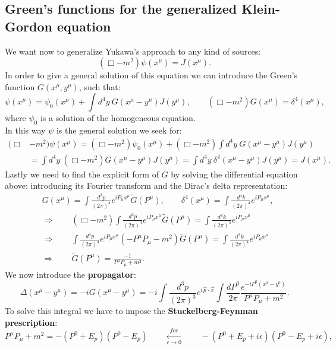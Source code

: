 \subsection{Green's functions for the generalized Klein-Gordon equation}
We want now to generalize Yukawa's approach to any kind of sources:
\begin{equation}
    (\Box-m^2)\psi(x^\mu)=J(x^\mu).
\end{equation}
In order to give a general solution of this equation we can introduce the Green's function $G(x^\mu,y^\mu)$, such that:
\begin{equation*}
    \psi(x^\mu)=\psi_0(x^\mu)+\int d^4y\ G(x^\mu-y^\mu)J(y^\mu),\qquad (\Box-m^2)G(x^\mu)=\delta^4(x^\mu),
\end{equation*}
where $\psi_0$ is a solution of the homogeneous equation.\\
In this way $\psi$ is the general solution we seek for:
\begin{align*}
    (\Box&-m^2)\psi(x^\mu)=(\Box-m^2)\psi_0(x^\mu)+(\Box-m^2)\int d^4y\ G(x^\mu-y^\mu)J(y^\mu)\\&=\int d^4y\ (\Box-m^2)G(x^\mu-y^\mu)J(y^\mu)=\int d^4y\ \delta^4(x^\mu-y^\mu)J(y^\mu)=J(x^\mu).
\end{align*}
Lastly we need to find the explicit form of $G$ by solving the differential equation above: introducing its Fourier transform and the Dirac's delta representation:
\begin{align*}
    &G(x^\mu)=\int\frac{d^3p}{(2\pi)^4}e^{iP_\mu x^\mu} \tilde{G}(P^\mu),\qquad \delta^4(x^\mu)=\int\frac{d^4k}{(2\pi)^4}e^{iP_\mu x^\mu},\\
    &\Rightarrow\qquad (\Box-m^2)\int\frac{d^3p}{(2\pi)^4}e^{iP_\mu x^\mu} \tilde{G}(P^\mu)=\int\frac{d^4k}{(2\pi)^4}e^{iP_\mu x^\mu}
    \\
    &\Rightarrow\qquad \int\frac{d^3p}{(2\pi)^4}e^{iP_\mu x^\mu} (-P^\mu P_\mu-m^2)\tilde{G}(P^\mu)=\int\frac{d^4k}{(2\pi)^4}e^{iP_\mu x^\mu}
    \\
    &\Rightarrow\qquad \tilde{G}(P^\mu)=\frac{-1}{P^\mu P_\mu+m^2}.
\end{align*}
We now introduce the \textbf{propagator}:
\begin{equation*}
    \Delta(x^\mu-y^\mu)=-iG(x^\mu-y^\mu)=-i\int\frac{d^3p}{(2\pi)^3}e^{i\vec p\cdot \vec x}\int\frac{dP^0}{2\pi}\frac{e^{-iP^0(x^0-y^0)}}{P^\mu P_\mu+m^2}.
\end{equation*}
To solve this integral we have to impose the \textbf{Stuckelberg-Feynman prescription}: 
\begin{equation*}
    P^\mu P_\mu+m^2=-(P^0+E_p)(P^0-E_p)\qquad\xleftarrow[\epsilon\rightarrow0]{for}\qquad-(P^0+E_p+i\epsilon)(P^0-E_p+i\epsilon),
\end{equation*}

